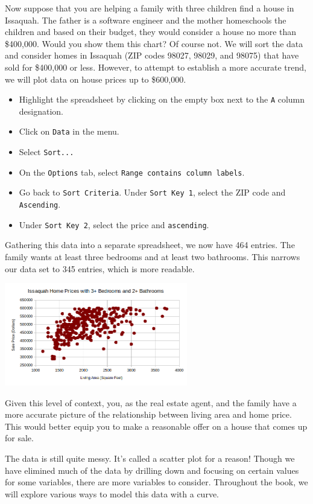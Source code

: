 Now suppose that you are helping a family with three children find a house in Issaquah. The father is a software engineer and the mother homeschools the children and based on their budget, they would consider a house no more than \$400,000. Would you show them this chart? Of course not. We will sort the data and consider homes in Issaquah (ZIP codes 98027, 98029, and 98075) that have sold for \$400,000 or less. However, to attempt to establish a more accurate trend, we will plot data on house prices up to \$600,000.
  \begin{itemize}
    \item Highlight the spreadsheet by clicking on the empty box next to the {\tt A} column designation.
    \item Click on {\tt Data} in the menu.
    \item Select {\tt Sort...}
    \item On the {\tt Options} tab, select {\tt Range contains column labels}.
    \item Go back to {\tt Sort Criteria}. Under {\tt Sort Key 1}, select the ZIP code and {\tt Ascending}.
    \item Under {\tt Sort Key 2}, select the price and {\tt ascending}.
  \end{itemize}
  Gathering this data into a separate spreadsheet, we now have 464 entries. The family wants at least three bedrooms and at least two bathrooms. This narrows our data set to 345 entries, which is more readable.
  \begin{center}
  \includegraphics[width = 0.6\textwidth]{img/chap1/sec1-3/issaquah-homes.png}
  \end{center}
  Given this level of context, you, as the real estate agent, and the family have a more accurate picture of the relationship between living area and home price. This would better equip you to make a reasonable offer on a house that comes up for sale.

  The data is still quite messy. It's called a scatter plot for a reason! Though we have elimined much of the data by drilling down and focusing on certain values for some variables, there are more variables to consider. Throughout the book, we will explore various ways to model this data with a curve.
